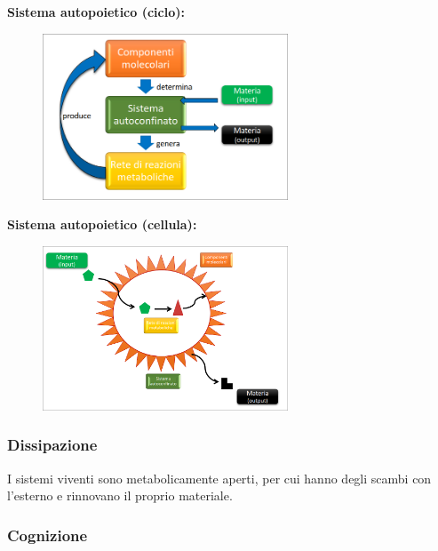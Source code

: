 \documentclass[a4paper]{article}
\begin{document}
\textbf{Sistema autopoietico (ciclo):}
\begin{figure}[ht]
    \centering
    \includegraphics[width=0.65\textwidth]{./sis_autop_ciclo.png}
\end{figure}

\textbf{Sistema autopoietico (cellula):}
\begin{figure}[ht]
    \centering
    \includegraphics[width=0.65\textwidth]{./sis_autop_cellula.png}
\end{figure}

\subsubsection{Dissipazione}

I sistemi viventi sono metabolicamente aperti, per cui hanno degli scambi con l'esterno
e rinnovano il proprio materiale.

\subsubsection{Cognizione}


\pagebreak
\end{document}
